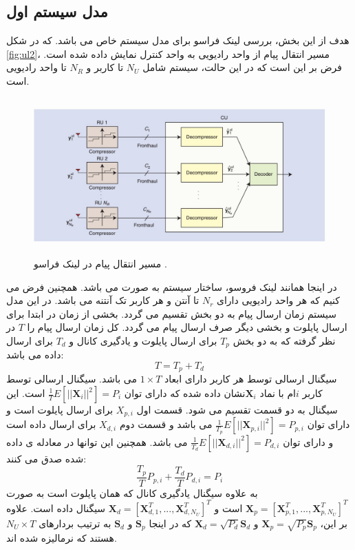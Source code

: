 \subsection{مدل سیستم اول}
هدف از این بخش، بررسی لینک فراسو برای مدل سیستم خاص می باشد\cite{ul_dl,ulSimeone, Fronthaul, precodSimeone}. که در شکل \eqref{fig:ul2}، مسیر انتقال پیام از واحد رادیویی به واحد کنترل نمایش داده شده است.
فرض بر این است که در این حالت، سیستم شامل $N_U$ تا کاربر و $N_R$ 
تا واحد رادیویی است. 

\begin{figure}[H]
  \centering
    \includegraphics[width=\linewidth, height=6cm]{ul2}
  \caption{مسیر انتقال پیام در لینک فراسو \cite{Fronthaul}.}
  \label{fig:ul2}
\end{figure}
در اینجا همانند لینک فروسو، ساختار سیستم به صورت  می باشد.  همچنین فرض می کنیم که هر واحد رادیویی دارای $N_r$ تا آنتن و هر کاربر تک آنتنه می باشد.\newline
در این مدل سیستم  زمان ارسال پیام به دو بخش تقسیم می گردد. بخشی از زمان در ابتدا برای ارسال پایلوت و بخشی دیگر صرف ارسال پیام می گردد. کل زمان ارسال پیام را $T$ در نظر گرفته  که به دو بخش $T_p$ برای ارسال پایلوت و یادگیری کانال و $T_d$ برای ارسال داده می باشد:
\begin{equation}
T = T_p + T_d
\end{equation}
سیگنال ارسالی توسط هر کاربر دارای ابعاد $1 \times T$ می باشد.
سیگنال ارسالی توسط کاربر $i$ام با نماد $\boldsymbol{X}_i$نشان داده شده که دارای توان 
 $\frac{1}{T} \mathit{E}[||\boldsymbol{X}_{i} ||^2] = P_{i}$
است. این سیگنال
به دو قسمت تقسیم می شود. قسمت اول
 $X_{p,i}$
  برای ارسال پایلوت است و دارای توان 
 $\frac{1}{T_p} \mathit{E}[||\boldsymbol{X}_{p,i} ||^2] = P_{p,i}$
می باشد و قسمت دوم
 $X_{d,i}$
 برای ارسال داده است و دارای توان 
 $\frac{1}{T_d} \mathit{E}[||\boldsymbol{X}_{d,i} ||^2] = P_{d,i}$
 می باشد.
 همچنین این توانها در معادله ی داده شده صدق می کنند:
 \begin{equation}
 \frac{T_p}{T}P_{p,i} +  \frac{T_d}{T}P_{d,i} = P_i
 \end{equation}
به علاوه سیگنال  یادگیری کانال که همان پایلوت است به صورت
 $\boldsymbol{X}_p = [\boldsymbol{X}_{p,1}^T,...,\boldsymbol{X}_{p,N_U}^T]^T$
است و
  $\boldsymbol{X}_d = [\boldsymbol{X}_{d,1}^T,...,\boldsymbol{X}_{d,N_U}^T]^T$
  سیگنال داده است.
 علاوه بر این،  
 $\boldsymbol{X}_p = \sqrt{P_p} \boldsymbol{S}_p$
 و 
  $\boldsymbol{X}_d = \sqrt{P_d} \boldsymbol{S}_d$
  که در اینجا $\boldsymbol{S}_p$ و $\boldsymbol{S}_d$ به ترتیب بردارهای $N_U \times T$ هستند 
  که نرمالیزه شده اند.
  
